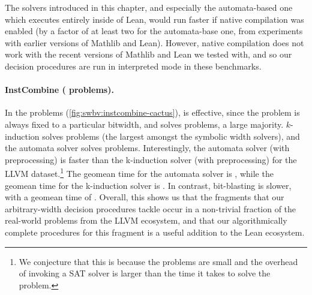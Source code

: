 The solvers introduced in this chapter, and especially the automata-based one
which executes entirely inside of Lean, would run faster if native compilation
was enabled (by a factor of at least two for the automata-base one, from
experiments with earlier versions of Mathlib and Lean). However, native
compilation does not work with the recent versions of Mathlib and Lean we tested
with, and so our decision procedures are run in interpreted mode in these
benchmarks.

\paragraph{InstCombine (\InstCombineTotalProblems{} problems).} In the \InstCombineTotalProblems{} problems (\cref{fig:swbv:instcombine-cactus}),
\bvdecide{} is effective, since the problem is always fixed to a particular bitwidth,
and solves \InstCombineBvDecideNumSolved{} problems, a large majority.
$k$-induction solves \InstCombineNormCircuitVerifiedNumSolved{} problems (the largest amongst the symbolic width solvers),
and the automata solver solves \InstCombineNormPresburgerNumSolved{} problems.
Interestingly, the automata solver (with preprocessing) is faster than the k-induction solver (with preprocessing) for the LLVM dataset.\footnote{We conjecture that this is because the problems are small and the overhead of invoking a SAT solver is larger than the time it takes to solve the problem.}
The geomean time for the automata solver is \InstCombineNormPresburgerGeoMean{}, while the geomean time for the k-induction solver is \InstCombineNormCircuitVerifiedGeoMean{}. In contrast, bit-blasting is slower, with a geomean time of \InstCombineBvDecideGeoMean{}.
Overall, this shows us that the fragments that our arbitrary-width decision procedures tackle occur in a non-trivial fraction of the real-world problems from the LLVM ecosystem,
and that our algorithmically complete procedures for this fragment is a useful addition to the Lean ecosystem.

